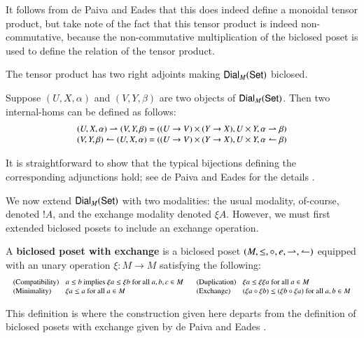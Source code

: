 \noindent
It follows from de Paiva and Eades \cite{dePaiva2018} that this does
indeed define a monoidal tensor product, but take note of the fact
that this tensor product is indeed non-commutative, because the
non-commutative multiplication of the biclosed poset is used to define
the relation of the tensor product.

The tensor product has two right adjoints making $\mathsf{Dial}_{M}(\mathsf{Set})$
biclosed.
\begin{definition}
  \label{def:dial-is-biclosed}
  Suppose $(U, X, \alpha)$ and $(V, Y, \beta)$ are two objects of
  $\mathsf{Dial}_{M}(\mathsf{Set})$. Then two internal-homs can be defined as follows:
  \[ \small
  \begin{array}{lll}
    (U, X, \alpha) \rightharpoonup (V, Y, \beta) = ((U \rightarrow V) \times (Y \rightarrow X), U \times Y, \alpha \rightharpoonup \beta)\\
    (V, Y, \beta) \leftharpoonup (U, X, \alpha) = ((U \rightarrow V) \times (Y \rightarrow X), U \times Y, \alpha \leftharpoonup \beta)\\
  \end{array}
  \]
\end{definition}
\noindent
It is straightforward to show that the typical bijections defining the
corresponding adjunctions hold; see de Paiva and Eades for the details
\cite{dePaiva2018}.

We now extend $\mathsf{Dial}_{M}(\mathsf{Set})$ with two modalities: the usual
modality, of-course, denoted $!A$, and the exchange modality denoted
$\xi A$.  However, we must first extended biclosed posets to
include an exchange operation.
\begin{definition}
  \label{def:biclosed-exchange}
  A \textbf{biclosed poset with exchange} is a biclosed poset $(M,
  \leq, \circ, e, \rightharpoonup, \leftharpoonup)$ equipped with an unary operation
  $\xi : M \to M$ satisfying the following:
  \[ \small
  \setlength{\arraycolsep}{4px}
  \begin{array}{lll}
    \begin{array}{lll}
    \text{(Compatibility)} & a \leq b \text{ implies } \xi a \leq \xi b \text{ for all } a,b,c \in M\\
    \text{(Minimality)} & \xi a \leq a \text{ for all } a \in M\\    
  \end{array}
  &
  \begin{array}{lll}
    \text{(Duplication)} & \xi a \leq \xi\xi a \text{ for all } a \in M\\
    \text{(Exchange)} & (\xi a \circ \xi b) \leq (\xi b \circ \xi a) \text{ for all } a, b \in M\\
  \end{array}
  \end{array}
  \]
\end{definition}
\noindent
This definition is where the construction given here departs from the
definition of biclosed posets with exchange given by de Paiva and
Eades \cite{dePaiva2018}.

